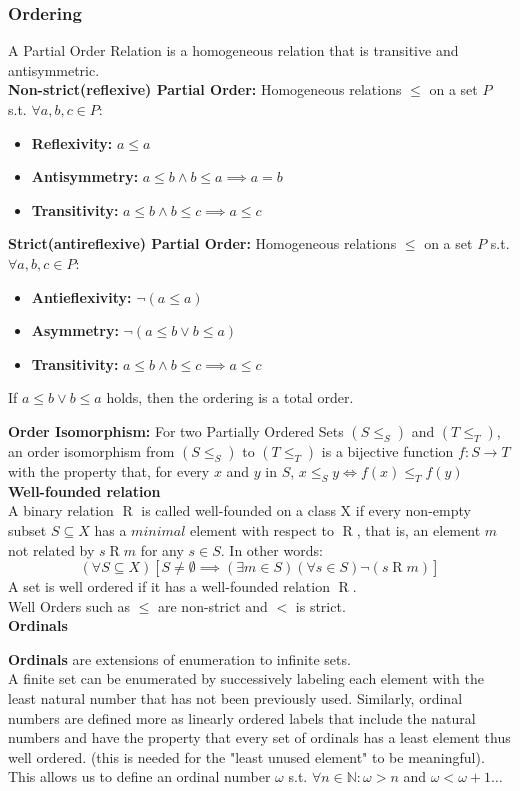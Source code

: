 \documentclass{article}
\newcommand{\0}{{\bf{0}}}
\begin{document}
\subsubsection{Ordering}
A Partial Order Relation is a homogeneous relation that is transitive and antisymmetric.\\
\textbf{Non-strict(reflexive) Partial Order:}
Homogeneous relations $\le$ on a set $P$ s.t. $\forall a,b,c\in P$:
\begin{itemize}
    \item \textbf{Reflexivity:} $a\leq a$
    \item \textbf{Antisymmetry:} $a\leq b\land b\leq a\implies a=b$
    \item \textbf{Transitivity:} $a\leq b\land b\leq c\implies a\leq c$
\end{itemize}
\textbf{Strict(antireflexive) Partial Order:}
Homogeneous relations $\le$ on a set $P$ s.t. $\forall a,b,c\in P$:
\begin{itemize}
    \item \textbf{Antieflexivity:} $\neg(a\leq a)$
    \item \textbf{Asymmetry:} $\neg(a\leq b\lor b\leq a)$
    \item \textbf{Transitivity:} $a\leq b\land b\leq c\implies a\leq c$
\end{itemize}
If $a\leq b\lor b\leq a$ holds, then the ordering is a total order.

\textbf{Order Isomorphism:} For two Partially Ordered Sets $(S\leq _{S})$ and $(T\leq _{T})$, an order isomorphism from $(S\leq _{S})$ to $(T\leq _{T})$ is a bijective function $f:S\to T$ with the property that, for every $x$ and $y$ in $S$, $x\leq _{S}y\iff f(x)\leq _{T}f(y)$
$$$$
\textbf{Well-founded relation}\\
A binary relation $\mathrel{R}$ is called well-founded on a class X if every non-empty subset $S\subseteq{}X$ has a $minimal$ element with respect to $\mathrel{R}$, that is, an element $m$ not related by $s\mathrel{R}m$ for any $s\in{}S$. In other words:
$$(\forall{}S\subseteq{}X)[S\neq\emptyset\implies (\exists{}m\in S)(\forall{}s\in S)\neg(s\mathrel{R}m)]$$
A set is well ordered if it has a well-founded relation $\mathrel{R}$.\\
Well Orders such as $\le$ are non-strict and $<$ is strict.\\
\textbf{Ordinals}

\textbf{Ordinals} are extensions of enumeration to infinite sets.\\
A finite set can be enumerated by successively labeling each element with the least natural number that has not been previously used. Similarly, ordinal numbers are defined more as linearly ordered labels that include the natural numbers and have the property that every set of ordinals has a least element thus well ordered. (this is needed for the "least unused element" to be meaningful). This allows us to define an ordinal number $\omega$ s.t. $\forall{}n\in\mathbb{N}:\omega>n$ and $\omega<\omega +1\dots$
\end{document}
